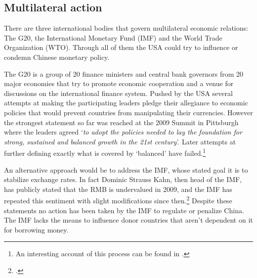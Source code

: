 

\subsection{Multilateral action}

There are three international bodies that govern multilateral economic relations: The 
G20, the International Monetary Fund (IMF) and the World Trade 
Organization (WTO). Through all of them the USA could try to influence or condemn Chinese monetary policy.

The G20 is a group of 20 finance ministers and central bank governors 
from 20 major economies that try to promote economic cooperation and a 
venue for discussions on the international finance system. Pushed by the 
USA several attempts at making the participating leaders pledge their 
allegiance to economic policies that would prevent countries from 
manipulating their currencies. However the strongest statement so far 
was reached at the 2009 Summit in Pittsburgh where the leaders agreed 
`\textit{to adopt the policies needed to lay the foundation for strong, 
sustained and balanced growth in the 21st century}'. Later attempts at 
further defining exactly what is covered by `balanced' have 
failed.\footnote{An interesting account of this process can be found in 
\cite{Levy11}.}

An alternative approach would be to address the IMF, whose stated goal it
is to stabilize exchange rates. In fact Dominic Strauss Kahn, then head of the IMF, has 
publicly stated that the RMB is undervalued in 2009, and the IMF has 
repeated this sentiment with slight modifications since 
then.\footnote{\cite{reuters09}.}  Despite these statements no action has been taken 
by the IMF to regulate or penalize China. The IMF
lacks the means to influence donor countries that aren't dependent on it for 
borrowing money.

